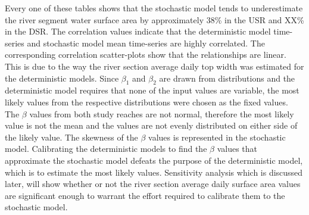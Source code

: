 Every one of these tables shows that the stochastic model tends to underestimate the river segment water surface area by approximately 38\% in the USR and XX\% in the DSR.  The correlation values indicate that the deterministic model time-series and stochastic model mean time-series are highly correlated.  The corresponding correlation scatter-plots show that the relationships are linear.  This is due to the way the river section average daily top width was estimated for the deterministic models.  Since $ \beta_1 $ and $ \beta_2 $ are drawn from distributions and the deterministic model requires that none of the input values are variable, the most likely values from the respective distributions were chosen as the fixed values.  The $ \beta $ values from both study reaches are not normal, therefore the most likely value is not the mean and the values are not evenly distributed on either side of the likely value.  The skewness of the $ \beta $ values is represented in the stochastic model.  Calibrating the deterministic models to find the $ \beta $ values that approximate the stochastic model defeats the purpose of the deterministic model, which is to estimate the most likely values.  Sensitivity analysis which is discussed later, will show whether or not the river section average daily surface area values are significant enough to warrant the effort required to calibrate them to the stochastic model.

